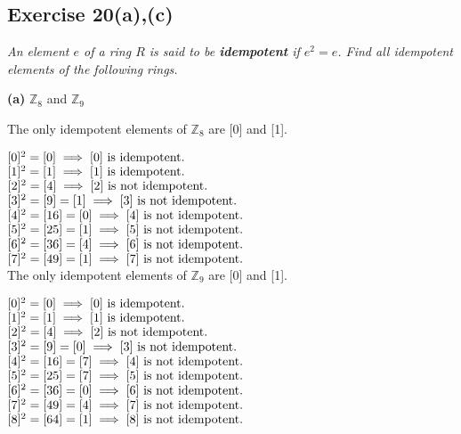 \subsection*{Exercise 20(a),(c)}
\textit{An element $e$ of a ring $R$ is said to be \textbf{idempotent} if $e^2 = e$. Find all idempotent elements of the following rings.}

\textbf{(a)} $\mathbb{Z}_8$ and $\mathbb{Z}_9$

\vspace{5 mm}
The only idempotent elements of $\mathbb{Z}_8$ are [0] and [1].

$[0]^2 = [0] \implies [0] \textnormal{ is idempotent.}$ \\
$[1]^2 = [1] \implies [1] \textnormal{ is idempotent.}$ \\
$[2]^2 = [4] \implies [2] \textnormal{ is not idempotent.}$ \\
$[3]^2 = [9] = [1] \implies [3] \textnormal{ is not idempotent.}$ \\
$[4]^2 = [16] = [0] \implies [4] \textnormal{ is not idempotent.}$ \\
$[5]^2 = [25] = [1] \implies [5] \textnormal{ is not idempotent.}$ \\
$[6]^2 = [36] = [4] \implies [6] \textnormal{ is not idempotent.}$ \\
$[7]^2 = [49] = [1] \implies [7] \textnormal{ is not idempotent.}$ \\

The only idempotent elements of $\mathbb{Z}_9$ are [0] and [1].

$[0]^2 = [0] \implies [0] \textnormal{ is idempotent.}$ \\
$[1]^2 = [1] \implies [1] \textnormal{ is idempotent.}$ \\
$[2]^2 = [4] \implies [2] \textnormal{ is not idempotent.}$ \\
$[3]^2 = [9] = [0] \implies [3] \textnormal{ is not idempotent.}$ \\
$[4]^2 = [16] = [7] \implies [4] \textnormal{ is not idempotent.}$ \\
$[5]^2 = [25] = [7] \implies [5] \textnormal{ is not idempotent.}$ \\
$[6]^2 = [36] = [0] \implies [6] \textnormal{ is not idempotent.}$ \\
$[7]^2 = [49] = [4] \implies [7] \textnormal{ is not idempotent.}$ \\
$[8]^2 = [64] = [1] \implies [8] \textnormal{ is not idempotent.}$
\vspace{5 mm}

